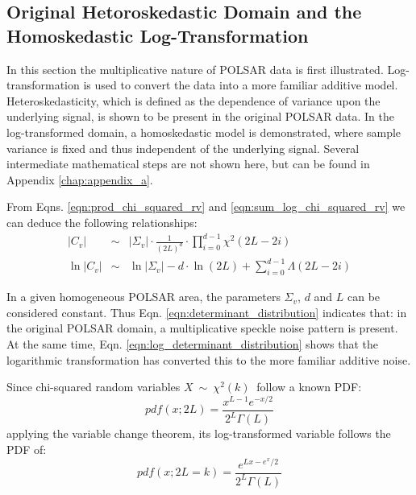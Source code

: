 \documentclass[journal]{IEEEtran}
\begin{document}
\subsection{Original Hetoroskedastic Domain and the Homoskedastic Log-Transformation}
\label{sec:polsar_heterosked_model_and_log_transform}

In this section the multiplicative nature of POLSAR data is first illustrated.
 Log-transformation is used to convert  the data into a more familiar additive model.
Heteroskedasticity, which is defined as the dependence of variance upon the underlying signal,
  is shown to be present in the original POLSAR data.
In the log-transformed domain, a homoskedastic model is demonstrated,
  where sample variance is fixed and thus independent of the underlying signal.
Several intermediate mathematical steps are not shown here, but can be found in Appendix \ref{chap:appendix_a}.
  
From Eqns. \ref{eqn:prod_chi_squared_rv} and \ref{eqn:sum_log_chi_squared_rv}
we can deduce the following relationships:
\begin{eqnarray}
  |C_v| &\sim& |\Sigma_v| \cdot \frac{1}{(2L)^d} \cdot \prod_{i=0}^{d-1} \chi^2 (2L-2i) \label{eqn:determinant_distribution} \\
  \ln|C_v| &\sim& \ln|\Sigma_v| - d \cdot \ln(2L) + \sum^{d-1}_{i=0} \Lambda(2L-2i)
\label{eqn:log_determinant_distribution}  
\end{eqnarray}

In a given homogeneous POLSAR area, the parameters $\Sigma_v$, $d$ and $L$ can be considered constant.
Thus Eqn. \ref{eqn:determinant_distribution} indicates that: 
  in the original POLSAR domain, a multiplicative speckle noise pattern is present.
At the same time, Eqn. \ref{eqn:log_determinant_distribution} shows that
  the logarithmic transformation has converted this to the more familiar additive noise.  

Since chi-squared random variables $X\ \sim\ \chi^2(k)\ $ follow a known PDF:
\begin{equation}
pdf(x;2L) =
  \frac{x^{L-1} e^{-x/2}}{2^L \Gamma\left(L\right)}
\label{eqn:chi_squared_dist_pdf:chap4}
\end{equation}
applying the variable change theorem, 
  its log-transformed variable follows the PDF of:
\begin{equation}
  pdf(x;2L=k) = \frac{e^{Lx-e^x/2}}{2^{L}\Gamma(L)}
\end{equation}
\end{document}
